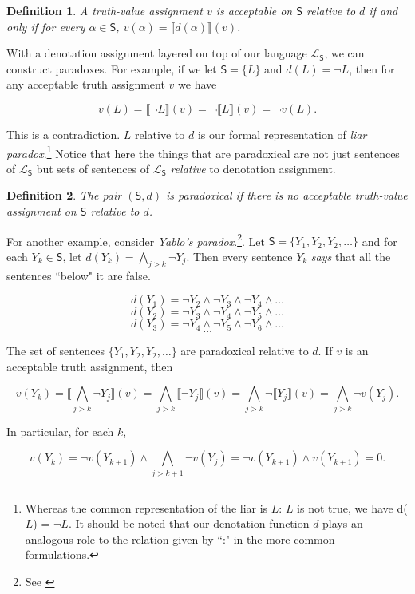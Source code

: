 \documentclass[12pt]{article}
\newtheorem{defn}{Definition}
\theoremstyle{remark}
\newcommand{\fancy}[1]{\mathcal{#1}}
\def\S{\textsf{S}}
\def\L{\fancy{L}}
\begin{document}
 \begin{defn} A truth-value assignment $v$ is acceptable on $\S$ relative to $d$ if and only if for every $\alpha \in \S$, $v(\alpha) = \llbracket d(\alpha) \rrbracket(v)$.
\end{defn}

With a denotation assignment layered on top of our language $\L_\S$, we can construct paradoxes. For example, if we let $\S = \{L\}$ and $d(L) = \neg L$, then for any acceptable truth assignment $v$ we have
 
\[v(L) = \llbracket \neg L \rrbracket(v) = \neg \llbracket L \rrbracket(v) = \neg v(L).\]
 
This is a contradiction. $L$ relative to $d$ is our formal representation of \textit{liar paradox}.\footnote{Whereas the common representation of the liar is $L$: $L$ is not true, we have d($L$) = $\neg L$. It should be noted that our denotation function $d$ plays an analogous role to the relation given by ``:" in the more common formulations.} Notice that here the things that are paradoxical are not just sentences of $\L_\S$ but sets of sentences of $\L_\S$ \textit{relative} to denotation assignment.

\begin{defn}
The pair $(\S, d)$ is \emph{paradoxical} if there is no acceptable truth-value assignment on $\S$ relative to $d$.
\end{defn}


For another example, consider \textit{Yablo's paradox}.\footnote{See \cite{yablo93}}. Let $\S = \{Y_1, Y_2, Y_2, \dots\}$ and for each $Y_k \in \S$, let $d(Y_k) = \bigwedge_{j > k} \neg Y_j$. Then every sentence $Y_k$ \textit{says} that all the sentences ``below" it are false.


\[d(Y_1) = \neg Y_2 \wedge  \neg Y_3 \wedge  \neg Y_4 \wedge \dots \]
\[d(Y_2) =  \neg Y_3 \wedge  \neg Y_4 \wedge  \neg Y_5 \wedge \dots \]
\[d(Y_3) =  \neg Y_4 \wedge  \neg Y_5 \wedge  \neg Y_6 \wedge \dots \]
\[\dots\]

The set of sentences $\{Y_1, Y_2, Y_2, \dots\}$ are paradoxical relative to $d$. If $v$ is an acceptable truth assignment, then
 
\[v(Y_k) = \llbracket \bigwedge_{j > k} \neg Y_j \rrbracket(v) = \bigwedge_{j > k} \llbracket \neg Y_j \rrbracket(v) = \bigwedge_{j > k} \neg \llbracket Y_j \rrbracket(v) = \bigwedge_{j > k} \neg v(Y_j).\]
 
In particular, for each $k$,
 
\[v(Y_k) = \neg v(Y_{k + 1}) \wedge \bigwedge_{j > k + 1} \neg v(Y_j) = \neg v(Y_{k + 1}) \wedge v(Y_{k + 1}) = 0.\]
 
\end{document}
